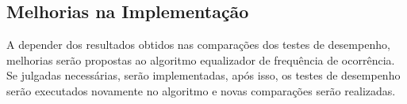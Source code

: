 	
	
	\subsection{Melhorias na Implementação}
	\label{improments}
	
	A depender dos resultados obtidos nas comparações dos testes de desempenho, melhorias serão propostas ao algoritmo equalizador de frequência de ocorrência. Se julgadas necessárias, serão implementadas, após isso, os testes de desempenho serão executados novamente no algoritmo e novas comparações serão realizadas. 
	